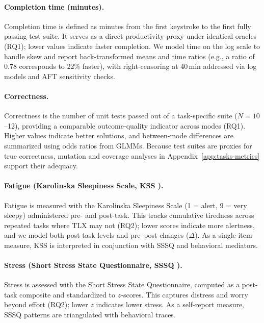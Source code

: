\documentclass[sigconf]{acmart}
\begin{document}
\paragraph{Completion time (minutes).}
Completion time is defined as minutes from the first keystroke to the first fully passing test suite. It serves as a direct productivity proxy under identical oracles (RQ1); lower values indicate faster completion. We model time on the log scale to handle skew and report back-transformed means and time ratios (e.g., a ratio of $0.78$ corresponds to 22\% faster), with right-censoring at 40\,min addressed via log models and AFT sensitivity checks.

\paragraph{Correctness.}
Correctness is the number of unit tests passed out of a task-specific suite ($N{=}10$--12), providing a comparable outcome-quality indicator across modes (RQ1). Higher values indicate better solutions, and between-mode differences are summarized using odds ratios from GLMMs. Because test suites are proxies for true correctness, mutation and coverage analyses in Appendix~\ref{app:tasks-metrics} support their adequacy.

\paragraph{Fatigue (Karolinska Sleepiness Scale, KSS \cite{kaida2006validation}).}
Fatigue is measured with the Karolinska Sleepiness Scale (1 = alert, 9 = very sleepy) administered pre- and post-task. This tracks cumulative tiredness across repeated tasks where TLX may not (RQ2); lower scores indicate more alertness, and we model both post-task levels and pre–post changes ($\Delta$). As a single-item measure, KSS is interpreted in conjunction with SSSQ and behavioral mediators.

\paragraph{Stress (Short Stress State Questionnaire, SSSQ \cite{helton2015short}).}
Stress is assessed with the Short Stress State Questionnaire, computed as a post-task composite and standardized to $z$-scores. This captures distress and worry beyond effort (RQ2); lower $z$ indicates lower stress. As a self-report measure, SSSQ patterns are triangulated with behavioral traces.
\end{document}
